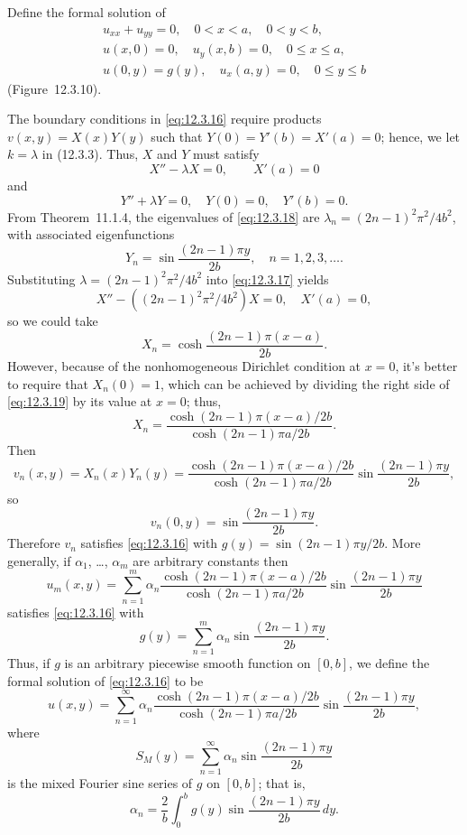 \setcounter{example}{4}
\setcounter{equation}{15}
\begin{example}
  \label{example:12.3.5} \rm Define the formal solution of
  \begin{equation}
    \label{eq:12.3.16}
    \begin{array}{c}
      u_{xx}+u_{yy}=0,\quad0<x<a,\quad0<y<b,          \\
      u(x,0)=0,\quad u_{y}(x,b)=0,\quad0\le x\le a,   \\
      u(0,y)=g(y),\quad u_{x}(a,y)=0,\quad0\le y\le b
    \end{array}
  \end{equation}
  (Figure~12.3.10).
\end{example}
\setcounter{equation}{16}
\begin{examplesolution}
\solution The boundary conditions in \eqref{eq:12.3.16} require products $v(x,y)=X(x)Y(y)$ such that
$Y(0)=Y'(b)=X'(a)=0$; hence, we let $k=\lambda$ in \textup{(12.3.3)}. Thus, $X$ and $Y$ must satisfy
\begin{equation}
  \label{eq:12.3.17}X''-\lambda X=0,\quad\quad X'(a)=0
\end{equation}
and
\begin{equation}
  \label{eq:12.3.18}Y''+\lambda Y=0,\quad Y(0)=0,\quad Y'(b)=0.
\end{equation}
From Theorem~11.1.4, the eigenvalues of \eqref{eq:12.3.18} are
$\lambda_{n}=(2n-1)^{2}\pi^{2}/4b^{2}$, with associated eigenfunctions
\[
  Y_{n}=\sin\frac{(2n-1)\pi y}{2b},\quad n=1,2,3,\dots.
\]
Substituting $\lambda=(2n-1)^{2}\pi^{2}/4b^{2}$ into \eqref{eq:12.3.17} yields
\[
  X''-((2n-1)^{2}\pi^{2}/4b^{2})X=0,\quad X'(a)=0,
\]
so we could take
\begin{equation}
  \label{eq:12.3.19}X_{n}=\cosh\frac{(2n-1)\pi(x-a)}{2b}.
\end{equation}
However, because of the nonhomogeneous Dirichlet condition at $x=0$, it's better to require that
$X_{n}(0)=1$, which can be achieved by dividing the right side of \eqref{eq:12.3.19} by its value at
$x=0$; thus,
\[
  X_{n}= \frac{\cosh(2n-1)\pi(x-a)/2b}{\cosh(2n-1)\pi a/2b}.
\]
Then
\[
  v_{n}(x,y)=X_{n}(x)Y_{n}(y)= \frac{\cosh(2n-1)\pi(x-a)/2b}{\cosh(2n-1)\pi a/2b}\sin\frac{(2n-1)\pi y}{2b},
\]
so
\[
  v_{n}(0,y)=\sin\frac{(2n-1)\pi y}{2b}.
\]
Therefore $v_{n}$ satisfies \eqref{eq:12.3.16} with $g(y)=\sin(2n-1)\pi y/2b$. More generally, if
$\alpha_{1}$, \dots, $\alpha_{m}$ are arbitrary constants then
\[
  u_{m}(x,y)=\sum_{n=1}^{m}\alpha_{n}\frac{\cosh(2n-1)\pi(x-a)/2b}{\cosh(2n-1)\pi a/2b}\sin\frac{(2n-1)\pi y}{2b}
\]
satisfies \eqref{eq:12.3.16} with
\[
  g(y)=\sum_{n=1}^{m}\alpha_{n}\sin\frac{(2n-1)\pi y}{2b}.
\]
Thus, if $g$ is an arbitrary piecewise smooth function on $[0,b]$, we define the formal solution of
\eqref{eq:12.3.16} to be
\[
  u(x,y)=\sum_{n=1}^{\infty}\alpha_{n}\frac{\cosh(2n-1)\pi(x-a)/2b}{\cosh(2n-1)\pi a/2b}\sin\frac{(2n-1)\pi y}{2b},
\]
where
\[
  S_{M}(y)=\sum_{n=1}^{\infty}\alpha_{n}\sin\frac{(2n-1)\pi y}{2b}
\]
is the mixed Fourier sine series of $g$ on $[0,b]$; that is,
\[
  \alpha_{n}=\frac{2}{b}\int_{0}^{b}g(y)\sin\frac{(2n-1)\pi y}{2b}\,dy.
\]
\end{examplesolution}

